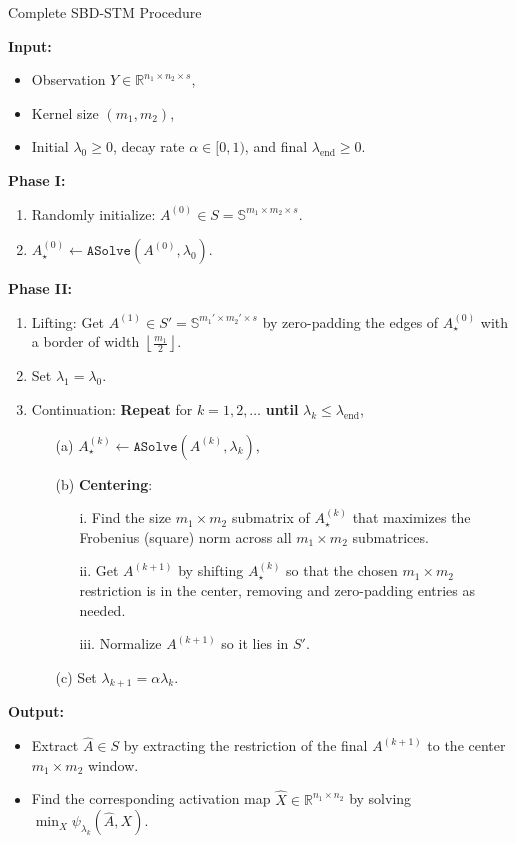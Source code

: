 \begin{algorithm}
	\label{SBDalgo}
	\caption{Complete SBD-STM Procedure}
	\textbf{Input:}
	\begin{itemize}
		\item Observation $Y \in \mathbb{R}^{n_1 \times n_2 \times s}$,
		\item Kernel size $(m_1, m_2)$,
		\item Initial $\lambda_0 \geq 0$, decay rate $\alpha \in [0,1)$, and final $\lambda_{\text{end}} \geq 0$.
	\end{itemize}
	
	\textbf{Phase I:}
	\begin{enumerate}
		\item Randomly initialize: $A^{(0)} \in S = \mathbb{S}^{m_1 \times m_2 \times s}$.
		\item $A_\star^{(0)} \leftarrow \texttt{ASolve}(A^{(0)}, \lambda_0)$.
	\end{enumerate}
	
	\textbf{Phase II:}
	\begin{enumerate}
		\item Lifting: Get $A^{(1)} \in S' = \mathbb{S}^{m_1' \times m_2' \times s}$ by zero-padding the edges of $A_\star^{(0)}$ with a border of width $\left\lfloor \frac{m_1}{2} \right\rfloor$.
		\item Set $\lambda_1 = \lambda_0$.
		\item Continuation: \textbf{Repeat} for $k = 1, 2, \dots$ \textbf{until} $\lambda_k \leq \lambda_{\text{end}}$,
		\begin{enumerate}
			\item[(a)] $A_\star^{(k)} \leftarrow \texttt{ASolve}(A^{(k)}, \lambda_k)$,
			\item[(b)] \textbf{Centering}:
			\begin{enumerate}
				\item[i.] Find the size $m_1 \times m_2$ submatrix of $A_\star^{(k)}$ that maximizes the Frobenius (square) norm across all $m_1 \times m_2$ submatrices.
				\item[ii.] Get $A^{(k+1)}$ by shifting $A_\star^{(k)}$ so that the chosen $m_1 \times m_2$ restriction is in the center, removing and zero-padding entries as needed.
				\item[iii.] Normalize $A^{(k+1)}$ so it lies in $S'$.
			\end{enumerate}
			\item[(c)] Set $\lambda_{k+1} = \alpha \lambda_k$.
		\end{enumerate}
	\end{enumerate}
	
	\textbf{Output:}
	\begin{itemize}
		\item Extract $\hat{A} \in S$ by extracting the restriction of the final $A^{(k+1)}$ to the center $m_1 \times m_2$ window.
		\item Find the corresponding activation map $\hat{X} \in \mathbb{R}^{n_1 \times n_2}$ by solving $\min_{X} \psi_{\lambda_k}(\hat{A}, X)$.
	\end{itemize}
\end{algorithm}

